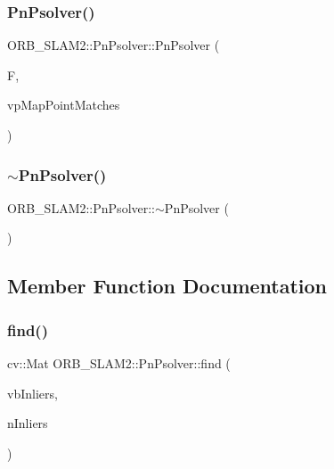 \subsubsection{\texorpdfstring{Pn\+Psolver()}{PnPsolver()}}
{\footnotesize\ttfamily O\+R\+B\+\_\+\+S\+L\+A\+M2\+::\+Pn\+Psolver\+::\+Pn\+Psolver (\begin{DoxyParamCaption}\item[{const \mbox{\hyperlink{class_o_r_b___s_l_a_m2_1_1_frame}{Frame}} \&}]{F,  }\item[{const vector$<$ \mbox{\hyperlink{class_o_r_b___s_l_a_m2_1_1_map_point}{Map\+Point}} $\ast$$>$ \&}]{vp\+Map\+Point\+Matches }\end{DoxyParamCaption})}

\mbox{\label{class_o_r_b___s_l_a_m2_1_1_pn_psolver_ad40b921779ed92bfb6b017a76e4d88aa}} 
\subsubsection{\texorpdfstring{$\sim$\+Pn\+Psolver()}{~PnPsolver()}}
{\footnotesize\ttfamily O\+R\+B\+\_\+\+S\+L\+A\+M2\+::\+Pn\+Psolver\+::$\sim$\+Pn\+Psolver (\begin{DoxyParamCaption}{ }\end{DoxyParamCaption})}



\subsection{Member Function Documentation}
\mbox{\label{class_o_r_b___s_l_a_m2_1_1_pn_psolver_a784429037a79cb53923f4db181a4d115}} 
\subsubsection{\texorpdfstring{find()}{find()}}
{\footnotesize\ttfamily cv\+::\+Mat O\+R\+B\+\_\+\+S\+L\+A\+M2\+::\+Pn\+Psolver\+::find (\begin{DoxyParamCaption}\item[{vector$<$ bool $>$ \&}]{vb\+Inliers,  }\item[{int \&}]{n\+Inliers }\end{DoxyParamCaption})}


